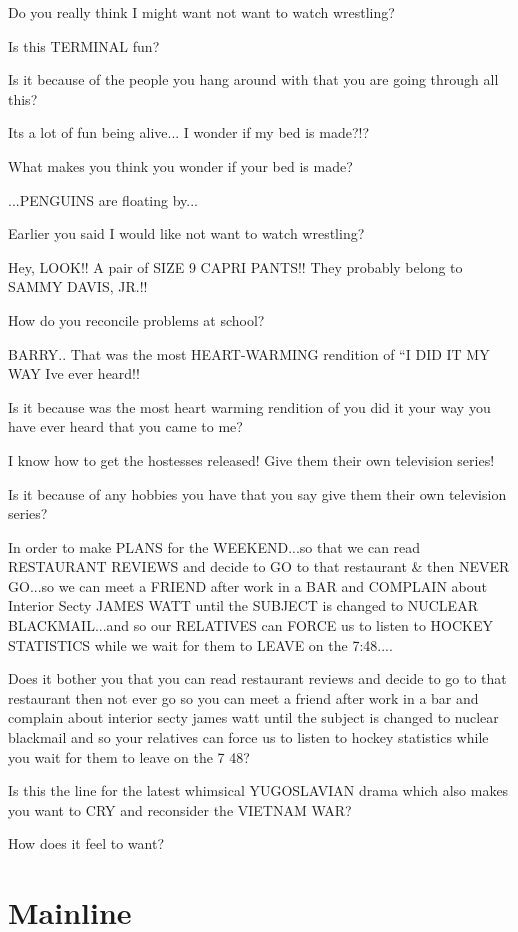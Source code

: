 \documentclass[cropmarks, frame, english]{idamasterthesis}
\begin{document}
Do you really think I might want not want to watch wrestling?

Is this TERMINAL fun?

Is it because of the people you hang around with that you are going
through all this?

Its a lot of fun being alive...  I wonder if my bed is made?!?

What makes you think you wonder if your bed is made?

...PENGUINS are floating by...

Earlier you said I would like not want to watch wrestling?

Hey, LOOK!!  A pair of SIZE 9 CAPRI PANTS!!  They probably belong to
 SAMMY DAVIS, JR.!!

How do you reconcile problems at school?

BARRY..  That was the most HEART-WARMING rendition of
 ``I DID IT MY WAY Ive ever heard!!

Is it because was the most heart warming rendition of you did it your
way you have ever heard that you came to me?

I know how to get the hostesses released!  Give them their own
 television series!

Is it because of any hobbies you have that you say give them their own
television series?

In order to make PLANS for the WEEKEND...so that we can read RESTAURANT
 REVIEWS and decide to GO to that restaurant \& then NEVER GO...so we can
 meet a FRIEND after work in a BAR and COMPLAIN about Interior Secty
 JAMES WATT until the SUBJECT is changed to NUCLEAR BLACKMAIL...and so
 our RELATIVES can FORCE us to listen to HOCKEY STATISTICS while we
 wait for them to LEAVE on the 7:48....

Does it bother you that you can read restaurant reviews and decide to
go to that restaurant then not ever go so you can meet a friend after
work in a bar and complain about interior secty james watt until the
subject is changed to nuclear blackmail and so your relatives can
force us to listen to hockey statistics while you wait for them to
leave on the 7 48?

Is this the line for the latest whimsical YUGOSLAVIAN drama which also
 makes you want to CRY and reconsider the VIETNAM WAR?

How does it feel to want?

\section{Mainline}
\end{document}
